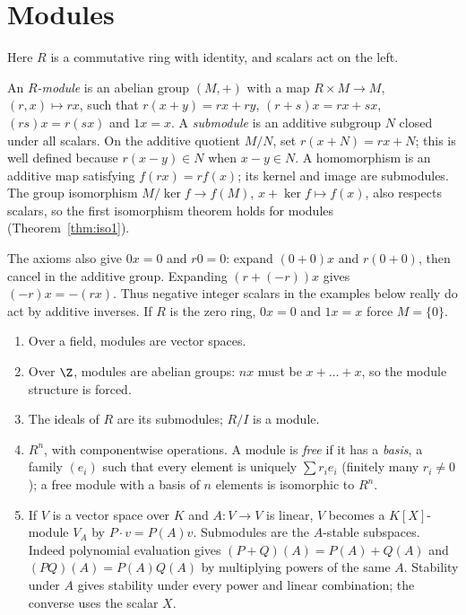 \section{Modules}

Here $R$ is a commutative ring with identity, and scalars act on the left.

\begin{definition}
An \emph{$R$-module} is an abelian group $(M,+)$ with a map $R\times M\to M$, $(r,x)\mapsto rx$, such that $r(x+y)=rx+ry$, $(r+s)x=rx+sx$, $(rs)x=r(sx)$ and $1x=x$. A \emph{submodule} is an additive subgroup $N$ closed under all scalars. On the additive quotient $M/N$, set $r(x+N)=rx+N$; this is well defined because $r(x-y)\in N$ when $x-y\in N$. A homomorphism is an additive map satisfying $f(rx)=rf(x)$; its kernel and image are submodules. The group isomorphism $M/\ker f\to f(M)$, $x+\ker f\mapsto f(x)$, also respects scalars, so the first isomorphism theorem holds for modules (Theorem~\ref{thm:iso1}).
\end{definition}

The axioms also give $0x=0$ and $r0=0$: expand $(0+0)x$ and
$r(0+0)$, then cancel in the additive group. Expanding $(r+(-r))x$
gives $(-r)x=-(rx)$. Thus negative integer scalars in the examples
below really do act by additive inverses. If $R$ is the zero ring,
$0x=0$ and $1x=x$ force $M=\{0\}$.

\begin{example}\label{ex:modules}
\begin{enumerate}[label=(\arabic*)]
\item Over a field, modules are vector spaces.
\item Over $\Z$, modules are abelian groups: $nx$ must be $x+\dots+x$, so the module structure is forced.
\item The ideals of $R$ are its submodules; $R/I$ is a module.
\item $R^n$, with componentwise operations. A module is \emph{free} if it has a \emph{basis}, a family $(e_i)$ such that every element is uniquely $\sum r_ie_i$ (finitely many $r_i\ne0$); a free module with a basis of $n$ elements is isomorphic to $R^n$.
\item If $V$ is a vector space over $K$ and $A:V\to V$ is linear, $V$ becomes a $K[X]$-module $V_A$ by $P\cdot v=P(A)v$. Submodules are the $A$-stable subspaces. Indeed polynomial evaluation gives $(P+Q)(A)=P(A)+Q(A)$ and $(PQ)(A)=P(A)Q(A)$ by multiplying powers of the same $A$. Stability under $A$ gives stability under every power and linear combination; the converse uses the scalar $X$.
\end{enumerate}
\end{example}

